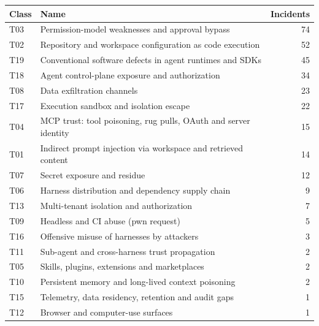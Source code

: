 \begin{tabular}{llr}
\toprule
Class & Name & Incidents \\
\midrule
T03 & Permission-model weaknesses and approval bypass & 74 \\
T02 & Repository and workspace configuration as code execution & 52 \\
T19 & Conventional software defects in agent runtimes and SDKs & 45 \\
T18 & Agent control-plane exposure and authorization & 34 \\
T08 & Data exfiltration channels & 23 \\
T17 & Execution sandbox and isolation escape & 22 \\
T04 & MCP trust: tool poisoning, rug pulls, OAuth and server identity & 15 \\
T01 & Indirect prompt injection via workspace and retrieved content & 14 \\
T07 & Secret exposure and residue & 12 \\
T06 & Harness distribution and dependency supply chain & 9 \\
T13 & Multi-tenant isolation and authorization & 7 \\
T09 & Headless and CI abuse (pwn request) & 5 \\
T16 & Offensive misuse of harnesses by attackers & 3 \\
T11 & Sub-agent and cross-harness trust propagation & 2 \\
T05 & Skills, plugins, extensions and marketplaces & 2 \\
T10 & Persistent memory and long-lived context poisoning & 2 \\
T15 & Telemetry, data residency, retention and audit gaps & 1 \\
T12 & Browser and computer-use surfaces & 1 \\
\bottomrule
\end{tabular}
